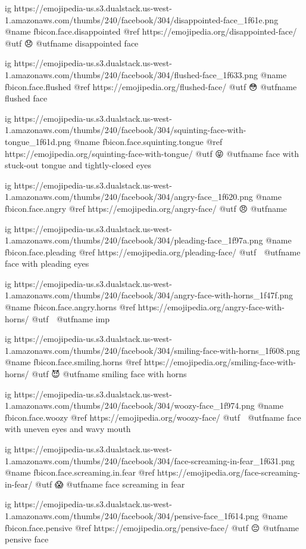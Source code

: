 	ig https://emojipedia-us.s3.dualstack.us-west-1.amazonaws.com/thumbs/240/facebook/304/disappointed-face_1f61e.png
	@name fbicon.face.disappointed
	@ref https://emojipedia.org/disappointed-face/
	@utf 😞
	@utfname disappointed face

	ig https://emojipedia-us.s3.dualstack.us-west-1.amazonaws.com/thumbs/240/facebook/304/flushed-face_1f633.png
	@name fbicon.face.flushed
	@ref https://emojipedia.org/flushed-face/
	@utf 😳
	@utfname flushed face

	ig https://emojipedia-us.s3.dualstack.us-west-1.amazonaws.com/thumbs/240/facebook/304/squinting-face-with-tongue_1f61d.png
	@name fbicon.face.squinting.tongue
	@ref https://emojipedia.org/squinting-face-with-tongue/
	@utf 😝
	@utfname face with stuck-out tongue and tightly-closed eyes

	ig https://emojipedia-us.s3.dualstack.us-west-1.amazonaws.com/thumbs/240/facebook/304/angry-face_1f620.png
	@name fbicon.face.angry
	@ref https://emojipedia.org/angry-face/
	@utf 😠
	@utfname

	ig https://emojipedia-us.s3.dualstack.us-west-1.amazonaws.com/thumbs/240/facebook/304/pleading-face_1f97a.png
	@name fbicon.face.pleading
	@ref https://emojipedia.org/pleading-face/
	@utf 🥺
	@utfname face with pleading eyes

	ig https://emojipedia-us.s3.dualstack.us-west-1.amazonaws.com/thumbs/240/facebook/304/angry-face-with-horns_1f47f.png
	@name fbicon.face.angry.horns
	@ref https://emojipedia.org/angry-face-with-horns/
	@utf 👿
	@utfname imp

	ig https://emojipedia-us.s3.dualstack.us-west-1.amazonaws.com/thumbs/240/facebook/304/smiling-face-with-horns_1f608.png
	@name fbicon.face.smiling.horns
	@ref https://emojipedia.org/smiling-face-with-horns/
	@utf 😈
	@utfname smiling face with horns

	ig https://emojipedia-us.s3.dualstack.us-west-1.amazonaws.com/thumbs/240/facebook/304/woozy-face_1f974.png
	@name fbicon.face.woozy
	@ref https://emojipedia.org/woozy-face/
	@utf 🥴
	@utfname face with uneven eyes and wavy mouth

	ig https://emojipedia-us.s3.dualstack.us-west-1.amazonaws.com/thumbs/240/facebook/304/face-screaming-in-fear_1f631.png
	@name fbicon.face.screaming.in.fear
	@ref https://emojipedia.org/face-screaming-in-fear/
	@utf 😱
	@utfname face screaming in fear

	ig https://emojipedia-us.s3.dualstack.us-west-1.amazonaws.com/thumbs/240/facebook/304/pensive-face_1f614.png
	@name fbicon.face.pensive
	@ref https://emojipedia.org/pensive-face/
	@utf 😔
	@utfname pensive face

